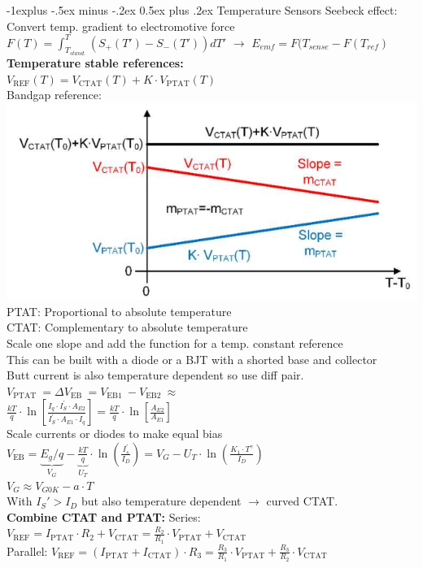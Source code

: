 \documentclass[5pt,landscape]{article}
\makeatletter
\renewcommand{\subsection}{\@startsection{subsection}{2}{0mm}%
                                {-1explus -.5ex minus -.2ex}%
                                {0.5ex plus .2ex}%
                                {\normalfont\normalsize\bfseries}}
\makeatother
\begin{document}
\begin{multicols*}{5}
\subsection{Temperature Sensors}
Seebeck effect: Convert temp. gradient to electromotive force
$ F(T)  \hat{=} \int_{T_{stand.}}^{T} (S_{+} (T') - S_- (T')) dT'   $ $ \rightarrow $ $ E_{emf} = F(T_{sense} - F(T_{ref})$
\textbf{Temperature stable references:}\\
$ V_{\mathrm{REF}}(T)=V_{\mathrm{CTAT}}(T)+K \cdot V_{\mathrm{PTAT}}(T) $\\
Bandgap reference:
\includegraphics[width=\columnwidth]{images/bandgapreference.png}
PTAT: Proportional to absolute temperature\\
CTAT: Complementary to absolute temperature\\
Scale one slope and add the function for a temp. constant reference\\
This can be built with a diode or a BJT with a shorted base and collector\\
Butt current is also temperature dependent so use diff pair.
$ V_{\text {PTAT }}=\Delta V_{\text {EB }}=V_{\text {EB1 }}-V_{\text {EB2 }} \approx $\\
$ \frac{k T}{q} \cdot \ln \left[\frac{I_{q} \cdot I_{S}^{\prime} \cdot A_{E 2}}{I_{S}^{\prime} \cdot A_{E 1} \cdot I_{q}}\right]=\frac{k T}{q} \cdot \ln \left[\frac{A_{E 2}}{A_{E 1}}\right] $\\
Scale currents or diodes to make equal bias\\
$ V_{\mathrm{EB}}=\underbrace{E_{g} / q}_{V_{G}}-\underbrace{\frac{k T}{q}}_{U_{T}} \cdot \ln \left(\frac{I_{s}^{\prime}}{I_{D}}\right)=V_{G}-U_{T} \cdot \ln \left(\frac{K_{1} \cdot T^{\gamma}}{I_{D}}\right) $\\
$ V_G \approx V_{G0K} - a \cdot T  $\\
With $ I_S' > I_D $ but also temperature dependent $ \rightarrow $ curved CTAT.\\
\textbf{Combine CTAT and PTAT:}
Series: $ V_{\mathrm{REF}}=I_{\mathrm{PTAT}} \cdot R_{2}+V_{\mathrm{CTAT}}=\frac{R_{2}}{R_{1}} \cdot V_{\mathrm{PTAT}}+V_{\mathrm{CTAT}} $\\
Parallel: $ V_{\mathrm{REF}}=\left(I_{\mathrm{PTAT}}+I_{\mathrm{CTAT}}\right) \cdot R_{3}=\frac{R_{3}}{R_{1}} \cdot V_{\mathrm{PTAT}}+\frac{R_{3}}{R_{2}} \cdot V_{\mathrm{CTAT}} $\\

\end{multicols*}
\end{document}
